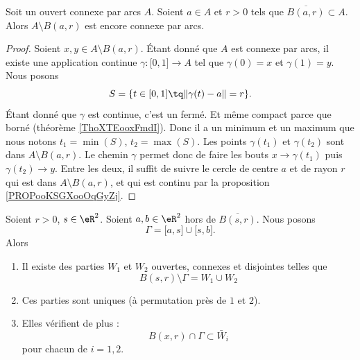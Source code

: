 \begin{proposition}	\label{PROPooOWHIooEXWvZx}
	Soit un ouvert connexe par arcs \( A\). Soient \( a\in A\) et \( r>0\) tels que \( \overline{B(a,r)}\subset A\). Alors \( A\setminus B(a,r)\) est encore connexe par arcs.
\end{proposition}

\begin{proof}
	Soient \( x,y\in A\setminus B(a,r)\). Étant donné que \( A\) est connexe par arcs, il existe une application continue \(\gamma \colon \mathopen[ 0,1\mathclose]\to A  \) tel que \( \gamma(0)=x\) et \( \gamma(1)=y\). Nous posons
	\begin{equation}
		S=\{ t\in\mathopen[ 0,1\mathclose]\tq \| \gamma(t)-a \|=r \}.
	\end{equation}
	Étant donné que \( \gamma\) est continue, c'est un fermé. Et même compact parce que borné (théorème \ref{ThoXTEooxFmdI}). Donc il a un minimum et un maximum que nous notons \( t_1=\min(S)\), \( t_2=\max(S)\). Les points \( \gamma(t_1)\) et \( \gamma(t_2)\) sont dans \( A\setminus B(a,r)\). Le chemin \( \gamma\) permet donc de faire les bouts \( x\to \gamma(t_1)\) puis \( \gamma(t_2)\to y\). Entre les deux, il suffit de suivre le cercle de centre \( a\) et de rayon \( r\) qui est dans \( A\setminus B(a,r)\), et qui est continu par la proposition \ref{PROPooKSGXooOqGyZj}.
\end{proof}


\begin{lemma}	\label{LEMooQPZPooMHwiOi}
	Soient \( r>0\), \( s\in \eR^2\). Soient \( a,b\in \eR^2\) hors de \( \overline{B(s,r)}\). Nous posons
	\begin{equation}
		\Gamma=\mathopen[ a,s\mathclose]\cup \mathopen[ s,b\mathclose].
	\end{equation}
	Alors
	\begin{enumerate}
		\item
		      Il existe des parties \( W_1\) et \( W_2\) ouvertes, connexes et disjointes telles que
		      \begin{equation}
			      B(s,r)\setminus \Gamma=W_1\cup W_2
		      \end{equation}
		\item
		      Ces parties sont uniques (à permutation près de \( 1\) et \( 2\)).
		\item
		      Elles vérifient de plus :
		      \begin{equation}
			      B(x,r)\cap \Gamma\subset \bar W_i
		      \end{equation}
		      pour chacun de \( i=1,2\).
	\end{enumerate}
\end{lemma}


